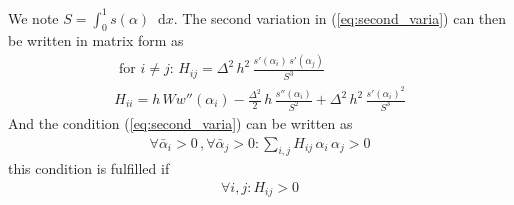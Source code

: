 \documentclass[final,3p,times,authoryear]{elsarticle}
\renewcommand*\d{\mathop{}\!\mathrm{d}} %
\begin{document}
We note $S=\int_0^1 s(\alpha) \d x$. The second variation in (\ref{eq:second_varia}) can then be written in matrix form as
\begin{subequations}
\begin{align}
\label{eq:second_varia_discrete}
\text{ for } i \neq j: \, H_{ij} = \Delta^2 \, h^2 \,  \frac{s'(\alpha_i) \, s'(\alpha_j)}{S^3} \\
%
H_{ii} = h\, W w''(\alpha_i) - \frac{\Delta^2}{2} \, h \,  \frac{s''(\alpha_i)}{S^2}  + \Delta^2 \, h^2 \,  \frac{s'(\alpha_i)^2}{S^3}
\end{align}
\end{subequations}
And the condition (\ref{eq:second_varia}) can be written as
\begin{align}
\label{eq:cond_second_varia_discrete}
\forall  \bar{\alpha}_i >0 \, , \forall  \bar{\alpha}_j >0  : \sum_{i,j} H_{ij} \, \alpha_i \, \alpha_j >0
\end{align}
this condition is fulfilled if
\begin{align}
\label{eq:cond_second_varia_discrete_bis}
\forall  i,j  :  H_{ij} >0
\end{align}




%
%
%
%
%
%
%
%
%





\end{document}
